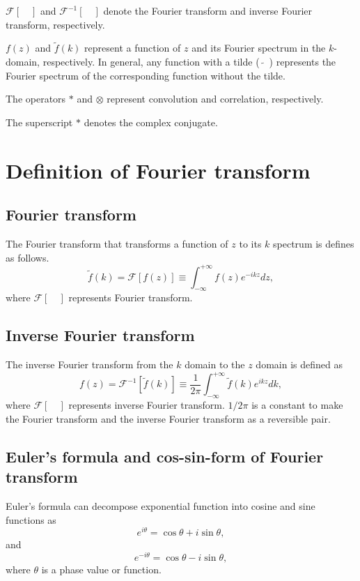 \documentclass[a4paper]{article}
\newcommand{\ftf}[1]{{\mathcal{F}\left[#1\right]\xspace}}
\newcommand{\iftf}[1]{{\mathcal{F}^{-1}\left[#1\right]\xspace}}
\newcommand{\ftt}[1]{{\tilde{#1}\xspace}}
\begin{document}
$\ftf{\quad}$ and $\iftf{\quad}$ denote the Fourier transform and inverse Fourier transform, respectively.

$f(z)$ and $\ftt{f}(k)$ represent a function of $z$ and its Fourier spectrum in the $k$-domain, respectively.
In general, any function with a tilde ($\tilde{\quad}$) represents the Fourier spectrum of the corresponding function without the tilde.

The operators $*$ and $\otimes$ represent convolution and correlation, respectively.

The superscript $*$ denotes the complex conjugate.

\section{Definition of Fourier transform}
\subsection{Fourier transform}
The Fourier transform that transforms a function of $z$ to its $k$ spectrum is defines as
follows.
\begin{equation}
	\ftt{f}(k) = \ftf{f(z)} \equiv \int^{+\infty}_{-\infty} f(z) e^{-ikz}dz,
\end{equation}
where $\ftf{\quad}$ represents Fourier transform.

\subsection{Inverse Fourier transform}
The inverse Fourier transform from the $k$ domain to the $z$ domain is defined as
\begin{equation}
	{f}(z) = \iftf{\ftt{f}(k)} \equiv \frac{1}{2\pi} \int^{+\infty}_{-\infty} \ftt{f}(k) e^{ikz}dk,
\end{equation}
where $\ftf{\quad}$ represents inverse Fourier transform.
$1/2 \pi$ is a constant to make the Fourier transform and the inverse Fourier transform as a reversible pair.

\subsection{Euler's formula and cos-sin-form of Fourier transform}
Euler's formula can decompose exponential function into cosine and sine functions as
\begin{equation}
	e^{i\theta} = \cos \theta + i \sin\theta,
\end{equation}
and
\begin{equation}
	e^{-i\theta} = \cos \theta - i \sin\theta,
\end{equation}
where $\theta$ is a phase value or function.
\end{document}
